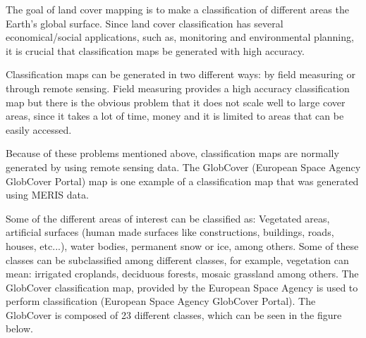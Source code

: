 The goal of land cover mapping is to make a classification of different areas the Earth's global surface. Since land cover classification has several economical/social applications, such as, monitoring and environmental planning, it is crucial that classification maps be generated with high accuracy.

Classification maps can be generated in two different ways: by field measuring or through remote sensing. Field measuring provides a high accuracy classification map but there is the obvious problem that it does not scale well to large cover areas, since it takes a lot of time, money and it is limited to areas that can be easily accessed. 

Because of these problems mentioned above, classification maps are normally generated by using remote sensing data. The GlobCover (European Space Agency GlobCover Portal) map is one example of a classification map that was generated using MERIS data.

Some of the different areas of interest can be classified as: Vegetated areas, artificial surfaces (human made surfaces like constructions, buildings, roads, houses, etc...), water bodies, permanent snow or ice, among others. Some of these classes can be subclassified among different classes, for example, vegetation can mean: irrigated croplands, deciduous forests, mosaic grassland among others. The GlobCover classification map, provided by the European Space Agency is used to perform classification (European Space Agency GlobCover Portal). The GlobCover is composed of 23 different classes, which can be seen in the figure below. 

